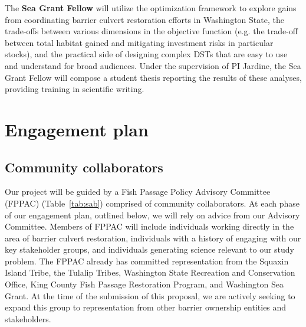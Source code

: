 \documentclass[12pt]{elsarticle}
\begin{document}
The \textbf{Sea Grant Fellow} will utilize the optimization framework to explore gains from coordinating barrier culvert restoration efforts in Washington State, the trade-offs between various dimensions in the objective function (e.g. the trade-off between total habitat gained and mitigating investment risks in particular stocks), and the practical side of designing complex DSTs that are easy to use and understand for broad audiences. Under the supervision of PI Jardine, the Sea Grant Fellow will compose a student thesis reporting the results of these analyses, providing training in scientific writing. \\



%
\section{Engagement plan \label{sec:engage}}

\subsection*{Community collaborators} 

Our project will be guided by a Fish Passage Policy Advisory Committee (FPPAC) (Table~\ref{tab:sab}) comprised of community collaborators. At each phase of our engagement plan, outlined below, we will rely on advice from our Advisory Committee. Members of FPPAC will include individuals working directly in the area of barrier culvert restoration, individuals with a history of engaging with our key stakeholder groups, and individuals generating science relevant to our study problem. The FPPAC already has committed representation from the Squaxin Island Tribe, the Tulalip Tribes, Washington State Recreation and Conservation Office, King County Fish Passage Restoration Program, and Washington Sea Grant. At the time of the submission of this proposal, we are actively seeking to expand this group to representation from other barrier ownership entities and stakeholders. 
\end{document}
